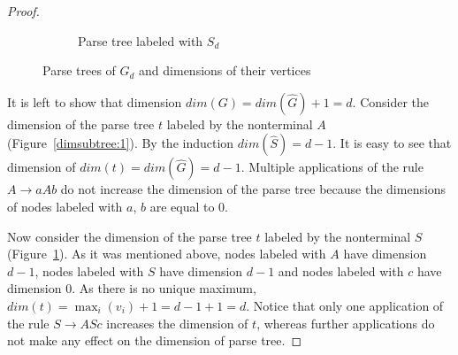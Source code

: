 \documentclass[11pt,a4paper]{article} %
\begin{document}
\begin{proof}
\begin{figure}[h]
\begin{subfigure}{.5\textwidth}
  \centering
  \begin{minipage}[m]{0.7\linewidth}
  \end{minipage}\hfill
  \caption{Parse tree labeled with $S_d$}
  \label{dimsubtree:2}
\end{subfigure}
\caption{Parse trees of $G_d$ and dimensions of their vertices}
\label{dimsubtree}
\end{figure}


It is left to show that dimension $dim(G) = dim(\hat{G}) + 1 = d$. Consider the dimension of the parse tree $t$ labeled by the nonterminal $A$ (Figure~\ref{dimsubtree:1}). By the induction $dim(\hat{S}) = d-1$. It is easy to see that dimension of $dim(t) = dim(\hat{G}) = d-1$. Multiple applications of the rule $A \rightarrow a A b$ do not increase the dimension of the parse tree because the dimensions of nodes labeled with $a$, $b$ are equal to $0$.

Now consider the dimension of the parse tree $t$ labeled by the nonterminal $S$ (Figure~\ref{dimsubtree:2}). As it was mentioned above, nodes labeled with $A$ have dimension $d -1$, nodes labeled with $S$ have dimension $d -1$ and  nodes labeled with $c$ have dimension $0$. As there is no unique maximum, $dim(t) = \max_{i} (v_i) + 1 = d - 1 + 1 = d$. Notice that only one application of the rule  $S \rightarrow A S c$ increases the dimension of $t$, whereas further applications do not make any effect on the dimension of parse tree.


\end{proof}
\end{document}
